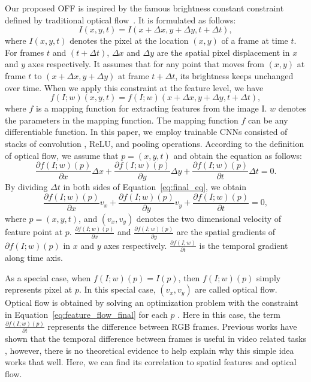 \documentclass[10pt,twocolumn,letterpaper]{article}
\begin{document}
Our proposed OFF is inspired by the famous brightness constant constraint defined by traditional optical flow~\cite{HornBertholdK.P.;Schunck1981}. It is formulated as follows:
\begin{equation}
\label{eq:constraint_image}
I(x, y, t) = I(x + \Delta x, y + \Delta y, t + \Delta t),
\end{equation}
where $I(x, y, t)$ denotes the pixel at the location $(x,y)$ of a frame at time $t$. For frames $t$ and $(t + \Delta t)$, $\Delta x$ and $\Delta y$ are the spatial pixel displacement in $x$ and $y$ axes respectively. It assumes that for any point that moves from $(x, y)$ at frame $t$ to $(x + \Delta x, y + \Delta y)$ at frame $t+\Delta t$, its brightness keeps unchanged over time.  
When we apply this constraint at the feature level, we have
\begin{equation}
\label{eq:constraint_feature}
f(I;w)(x, y, t) =f(I;w)(x + \Delta x, y + \Delta y, t + \Delta t),
\end{equation}
where $f$ is a mapping function for extracting features from the image I. $w$ denotes the parameters in the mapping function. The mapping function $f$ can be any differentiable function. In this paper, we employ trainable CNNs consisted of stacks of convolution , ReLU, and pooling operations. According to the definition of optical flow, we assume that $p=(x, y,t)$ and obtain the equation as follows:
\begin{equation}
\label{eq:final_eq}
\frac{\partial f(I;w)(p)}{\partial x}\Delta x + \frac{\partial f(I;w)(p)}{\partial y}\Delta y + \frac{\partial f(I;w)(p)}{\partial t}\Delta t = 0.
\end{equation}
 By dividing $\Delta t$ in both sides of Equation~\ref{eq:final_eq}, we obtain
\begin{equation}
\label{eq:feature_flow_final}
\frac{\partial f(I;w)(p)}{\partial x}v_{x} + \frac{\partial f(I;w)(p)}{\partial y}v_{y} + \frac{\partial f(I;w)(p)}{\partial t} = 0,
\end{equation}
where $p=(x, y,t)$, and $(v_{x}, v_{y})$ denotes the two dimensional velocity of feature point at $p$. $\frac{\partial f(I;w)(p)}{\partial x}$ and $\frac{\partial f(I;w)(p)}{\partial y}$ are the spatial gradients of $\partial f(I;w)(p)$ in $x$ and $y$ axes respectively. $\frac{\partial f(I;w)}{\partial t}$ is the temporal gradient along time axis. 

As a special case, when $f(I;w)(p)=I(p)$, then $f(I;w)(p)$ simply represents pixel at $p$. In this special case, $(v_{x}, v_{y})$ are called optical flow. Optical flow is obtained by solving an optimization problem with the constraint in Equation~\ref{eq:feature_flow_final} for each $p$ \cite{barron1994performance,brox2004warpingflow,bigun1991multidimensional}. Here in this case, the term $\frac{\partial f(I;w)(p)}{\partial t}$ represents the difference between RGB frames.
Previous works have shown that the temporal difference between frames is useful in video related tasks \cite{wang2016tsn}, however, there is no theoretical evidence to help explain why this simple idea works that well. Here, we can find its correlation to spatial features and optical flow.
\end{document}
